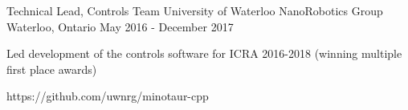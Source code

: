 \begin{cventries}

\cventrylink
{Technical Lead, Controls Team}
{University of Waterloo NanoRobotics Group}
{Waterloo, Ontario}
{May 2016 - December 2017} %
{ %
    Led development of the controls software for ICRA 2016-2018 (winning multiple first place awards)
\begin{cvitems}
\end{cvitems}
}
{https://github.com/uwnrg/minotaur-cpp}

\end{cventries}
